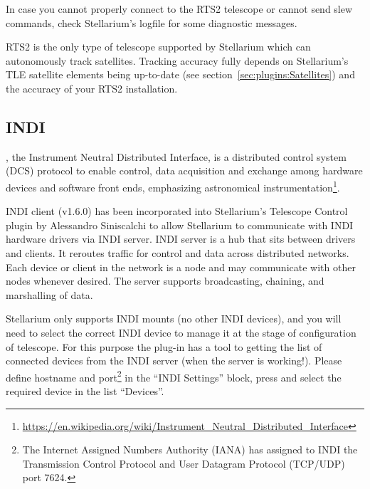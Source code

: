 In case you cannot properly connect to the RTS2 telescope or cannot send slew commands, 
check Stellarium's logfile  for some diagnostic messages.

RTS2 is the only type of telescope supported by Stellarium which can autonomously track satellites. 
Tracking accuracy fully depends on Stellarium's TLE satellite elements being up-to-date 
(see section~\ref{sec:plugins:Satellites}) and the accuracy of your RTS2 installation.

\subsection{INDI}
\label{sec:plugins:TelescopeControl:INDI}
, the Instrument Neutral Distributed Interface, 
is a distributed control system (DCS) protocol to enable control, data acquisition 
and exchange among hardware devices and software front ends, emphasizing astronomical 
instrumentation\footnote{\url{https://en.wikipedia.org/wiki/Instrument_Neutral_Distributed_Interface}}.
 
INDI client (v1.6.0) has been incorporated into Stellarium's Telescope Control plugin 
by Alessandro Siniscalchi to allow Stellarium to communicate with INDI hardware drivers via INDI server. 
INDI server is a hub that sits between drivers and clients. It reroutes traffic for control and data across distributed networks. 
Each device or client in the network is a node and may communicate with other nodes whenever desired. 
The server supports broadcasting, chaining, and marshalling of data.

Stellarium only supports INDI mounts (no other INDI devices), and you will need to select the correct INDI device 
to manage it at the stage of configuration of telescope. 
For this purpose the plug-in has a tool to getting the list of connected devices from the INDI server (when the server is working!). 
Please define hostname and port\footnote{The Internet Assigned Numbers Authority (IANA) has assigned to INDI 
the Transmission Control Protocol and User Datagram Protocol (TCP/UDP) port 7624.} 
in the ``INDI Settings'' block, press  and select the required device in the list ``Devices''. 

